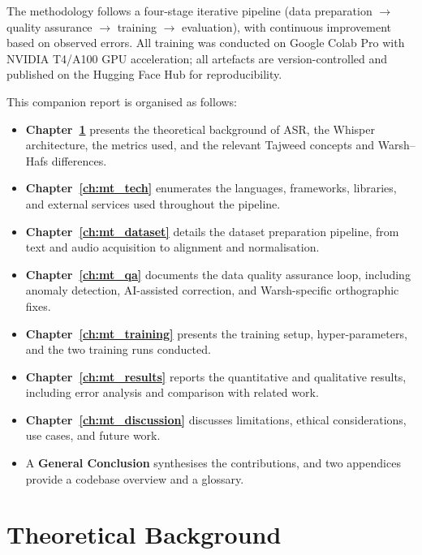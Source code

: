 \documentclass[12pt,a4paper]{report}
\begin{document}
The methodology follows a four-stage iterative pipeline (data preparation
$\rightarrow$ quality assurance $\rightarrow$ training $\rightarrow$
evaluation), with continuous improvement based on observed errors. All
training was conducted on Google Colab Pro with NVIDIA T4/A100 GPU
acceleration; all artefacts are version-controlled and published on the
Hugging Face Hub for reproducibility.

This companion report is organised as follows:
\begin{itemize}
  \item \textbf{Chapter~\ref{ch:mt_background}} presents the theoretical
        background of ASR, the Whisper architecture, the metrics used, and
        the relevant Tajweed concepts and Warsh--Hafs differences.
  \item \textbf{Chapter~\ref{ch:mt_tech}} enumerates the languages,
        frameworks, libraries, and external services used throughout the
        pipeline.
  \item \textbf{Chapter~\ref{ch:mt_dataset}} details the dataset
        preparation pipeline, from text and audio acquisition to alignment
        and normalisation.
  \item \textbf{Chapter~\ref{ch:mt_qa}} documents the data quality
        assurance loop, including anomaly detection, AI-assisted
        correction, and Warsh-specific orthographic fixes.
  \item \textbf{Chapter~\ref{ch:mt_training}} presents the training setup,
        hyper-parameters, and the two training runs conducted.
  \item \textbf{Chapter~\ref{ch:mt_results}} reports the quantitative and
        qualitative results, including error analysis and comparison with
        related work.
  \item \textbf{Chapter~\ref{ch:mt_discussion}} discusses limitations,
        ethical considerations, use cases, and future work.
  \item A \textbf{General Conclusion} synthesises the contributions, and
        two appendices provide a codebase overview and a glossary.
\end{itemize}

\chapter{Theoretical Background}
\label{ch:mt_background}
\end{document}
